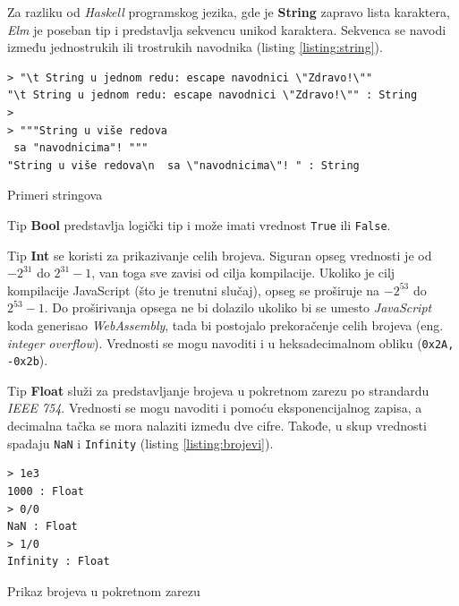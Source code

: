 \documentclass[12pt,oneside]{memoir}
\begin{document}
Za razliku od \emph{Haskell} programskog jezika, gde je \textbf{String} zapravo lista karaktera, \emph{Elm} je
poseban tip i predstavlja sekvencu unikod karaktera. Sekvenca se navodi između
jednostrukih ili trostrukih navodnika (listing \ref{listing:string}).

\begin{listing}[ht]
\begin{verbatim}
> "\t String u jednom redu: escape navodnici \"Zdravo!\""
"\t String u jednom redu: escape navodnici \"Zdravo!\"" : String
>
> """String u više redova
 sa "navodnicima"! """
"String u više redova\n  sa \"navodnicima\"! " : String
\end{verbatim}
\caption{Primeri stringova}
\label{listing:string}
\end{listing}

Tip \textbf{Bool} predstavlja logički tip i može imati vrednost \texttt{True} ili
\texttt{False}. 

Tip \textbf{Int} se koristi za prikazivanje celih brojeva. Siguran opseg vrednosti je
od \(-2^{31}\) do \(2^{31} - 1\), van toga sve zavisi od cilja kompilacije. Ukoliko je
cilj kompilacije JavaScript (što je trenutni slučaj), opseg se proširuje na \(-2^{53}\) do
\(2^{53} - 1\). Do proširivanja opsega ne bi dolazilo ukoliko bi se
umesto \emph{JavaScript} koda generisao \emph{WebAssembly}, tada bi postojalo prekoračenje celih
brojeva (eng. \emph{integer overflow}). Vrednosti se mogu navoditi i u heksadecimalnom
obliku (\texttt{0x2A, -0x2b}).

Tip \textbf{Float} služi za predstavljanje brojeva u pokretnom zarezu po strandardu
\emph{IEEE 754}. Vrednosti se mogu navoditi i pomoću eksponencijalnog zapisa, a decimalna 
tačka se mora nalaziti između dve cifre. Takođe, u skup vrednosti spadaju \texttt{NaN} i
\texttt{Infinity} (listing \ref{listing:brojevi}).

\begin{listing}[ht]
\begin{verbatim}
> 1e3
1000 : Float
> 0/0 
NaN : Float
> 1/0 
Infinity : Float
\end{verbatim}
\caption{Prikaz brojeva u pokretnom zarezu}
\label{listing:brojevi}
\end{listing}
\end{document}
